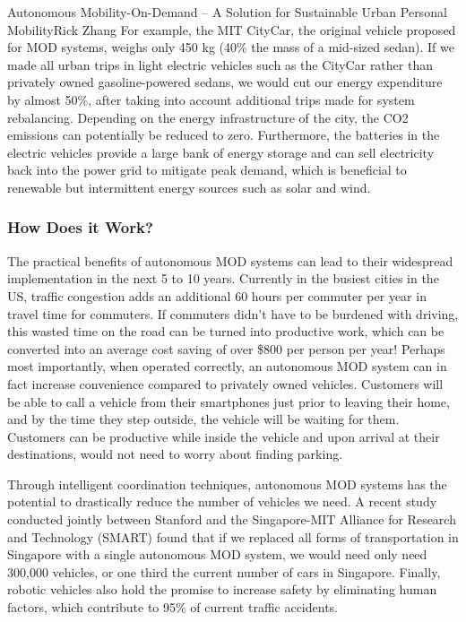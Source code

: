 \documentclass{papertex}
\begin{document}
\begin{news}{2}{Autonomous Mobility-On-Demand – A Solution for Sustainable Urban Personal Mobility}{Rick Zhang}{}{}
For example, the MIT CityCar, the original vehicle proposed for MOD systems, 
weighs only 450 kg (40\% the mass of a mid-sized sedan). If we made all urban 
trips in light electric vehicles such as the CityCar rather than privately 
owned gasoline-powered sedans, we would cut our energy expenditure by almost 
50\%, after taking into account additional trips made for system rebalancing. 
Depending on the energy infrastructure of the city, the CO2 emissions can 
potentially be reduced to zero. Furthermore, the batteries in the electric 
vehicles provide a large bank of energy storage and can sell electricity back 
into the power grid to mitigate peak demand, which is beneficial to renewable 
but intermittent energy sources such as solar and wind.

\subsubsection*{\textbf{How Does it Work?}}

The practical benefits of autonomous MOD systems can lead to their widespread 
implementation in the next 5 to 10 years. Currently in the busiest cities in 
the US, traffic congestion adds an additional 60 hours per commuter per year 
in travel time for commuters. If commuters didn’t have to be burdened with 
driving, this wasted time on the road can be turned into productive work, 
which can be converted into an average cost saving of over \$800 per person 
per year! Perhaps most importantly, when operated correctly, an autonomous 
MOD system can in fact increase convenience compared to privately owned 
vehicles. Customers will be able to call a vehicle from their smartphones 
just prior to leaving their home, and by the time they step outside, the 
vehicle will be waiting for them. Customers can be productive while inside 
the vehicle and upon arrival at their destinations, would not need to worry 
about finding parking.

Through intelligent coordination techniques, autonomous MOD systems has the 
potential to drastically reduce the number of vehicles we need. A recent study 
conducted jointly between Stanford and the Singapore-MIT Alliance for Research 
and Technology (SMART) found that if we replaced all forms of transportation 
in Singapore with a single autonomous MOD system, we would need only need 
300,000 vehicles, or one third the current number of cars in Singapore. 
Finally, robotic vehicles also hold the promise to increase safety by 
eliminating human factors, which contribute to 95\% of current traffic 
accidents.


\end{news}
\end{document}
